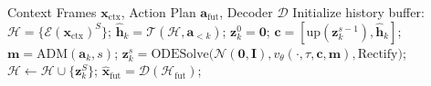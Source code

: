 \begin{algorithm}[t]
\caption{SAMPO++ Inference}
\label{algo:inference}
\begin{algorithmic}[1]
\REQUIRE Context Frames $\boldsymbol{x}_{\text{ctx}}$, Action Plan $\boldsymbol{a}_{\text{fut}}$, Decoder $\mathcal{D}$
\STATE Initialize history buffer: $\mathcal{H} = \{ \mathcal{E}(\boldsymbol{x}_{\text{ctx}})^S \}$; 
    \STATE $\hat{\boldsymbol{h}}_k = \mathcal{T}(\mathcal{H}, \boldsymbol{a}_{<k})$;
    \STATE $\boldsymbol{z}_k^0 = \boldsymbol{0}$; 
        \STATE $\boldsymbol{c} = [ \text{up}(\boldsymbol{z}_k^{s-1}), \hat{\boldsymbol{h}}_k ]$;
        \STATE $\boldsymbol{m} = \text{ADM}(\boldsymbol{a}_k, s)$; 
        \STATE $\boldsymbol{z}_k^s = \text{ODESolve}\big(\mathcal{N}(\boldsymbol{0}, \boldsymbol{I}), v_\theta(\cdot, \tau, \boldsymbol{c}, \boldsymbol{m}), \text{Rectify}\big)$; 
    \ENDFOR
    \STATE $\mathcal{H} \leftarrow \mathcal{H} \cup \{\boldsymbol{z}_k^S\}$; 
\ENDFOR
\RETURN $\hat{\boldsymbol{x}}_{\text{fut}} = \mathcal{D}(\mathcal{H}_{\text{fut}})$;
\end{algorithmic}
\end{algorithm}